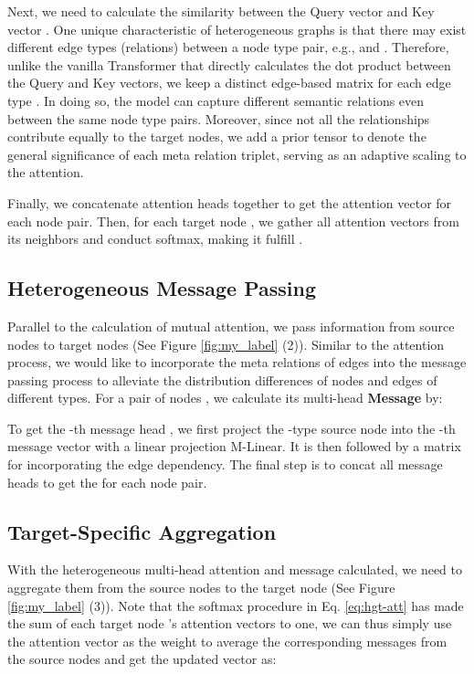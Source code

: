 \documentclass[sigconf]{acmart}
\theoremstyle{definition}
\begin{document}
Next, we need to calculate the similarity between the Query vector  and Key vector . 
One unique characteristic of heterogeneous graphs is that there may exist different edge types (relations) between a node type pair, e.g.,  and . 
Therefore, unlike the vanilla Transformer that directly calculates the dot product between the Query and Key vectors, we keep a distinct edge-based matrix  for each edge type . In doing so, the model can capture different semantic relations even between the same node type pairs. 
Moreover, since not all the relationships contribute equally to the target nodes, 
we add a prior tensor  to denote the general significance of each meta relation triplet, serving as an adaptive scaling to the attention. 

Finally, we concatenate  attention heads together to get the attention vector for each node pair. 
Then, for each target node , we gather all attention vectors from its neighbors  and conduct softmax, making it fulfill .



\subsection{Heterogeneous Message Passing}
Parallel to the calculation of mutual attention, we pass information from source nodes to target nodes (See Figure \ref{fig:my_label} (2)). 
Similar to the attention process, we would like to incorporate the meta relations of edges into the message passing process to alleviate the distribution differences of nodes and edges of different types. For a pair of nodes , we calculate its multi-head \textbf{Message} by:

To get the -th message head , we first project the -type source node  into the -th message vector with a linear projection M-Linear. 
It is then followed by a matrix  for incorporating the edge dependency. 
The final step is to concat all  message heads to get the   for each node pair.


\subsection{Target-Specific Aggregation}
With the heterogeneous multi-head attention and message calculated, we need to aggregate them from the source nodes to the target node (See Figure \ref{fig:my_label} (3)). 
Note that the softmax procedure in Eq. \ref{eq:hgt-att} has made the sum of each target node 's attention vectors to one, we can thus simply use the attention vector as the weight to average the corresponding messages from the source nodes and get the updated vector  as:
\end{document}
